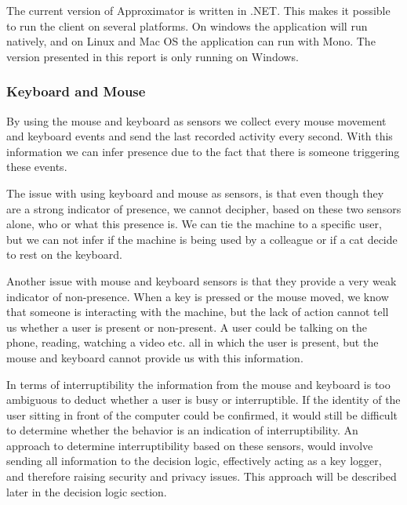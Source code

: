 \documentclass{sigchi}
\begin{document}
The current version of Approximator is written in .NET.
This makes it possible to run the client on several platforms.
On windows the application will run natively,
and on Linux and Mac OS the application can run with Mono.
The version presented in this report is only running on Windows.

\subsubsection{Keyboard and Mouse}
By using the mouse and keyboard as sensors we collect every mouse movement and keyboard events and send the last recorded activity every second.
With this information we can infer presence due to the fact that there is someone triggering these events.

The issue with using keyboard and mouse as sensors, is that even though they are a strong indicator of presence, we cannot decipher, based on these two sensors alone, who or what this presence is.
We can tie the machine to a specific user, but we can not infer if the machine is being used by a colleague or if a cat decide to rest on the keyboard.

Another issue with mouse and keyboard sensors is that they provide a very weak indicator of non-presence.
When a key is pressed or the mouse moved, we know that someone is interacting with the machine, but the lack of action cannot tell us whether a user is present or non-present.
A user could be talking on the phone, reading, watching a video etc. all in which the user is present, but the mouse and keyboard cannot provide us with this information.

In terms of interruptibility the information from the mouse and keyboard is too ambiguous to deduct whether a user is busy or interruptible.
If the identity of the user sitting in front of the computer could be confirmed, it would still be difficult to determine whether the behavior is an indication of interruptibility.
An approach to determine interruptibility based on these sensors, would involve sending all information to the decision logic, effectively acting as a key logger, and therefore raising security and privacy issues.
This approach will be described later in the decision logic section.
\end{document}
